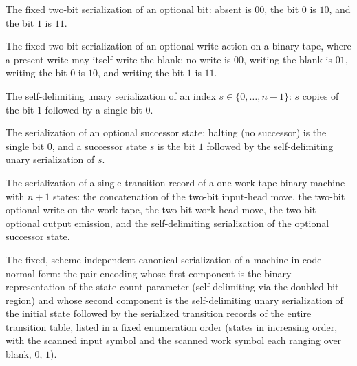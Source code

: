 \begin{definition}
\label{Turing.optBoolBits}
\leanok
The fixed two-bit serialization of an optional bit: absent is $00$, the bit
$0$ is $10$, and the bit $1$ is $11$.
\end{definition}

\begin{definition}
\label{Turing.optOptBoolBits}
\leanok
The fixed two-bit serialization of an optional write action on a binary
tape, where a present write may itself write the blank: no write is $00$,
writing the blank is $01$, writing the bit $0$ is $10$, and writing the bit
$1$ is $11$.
\end{definition}

\begin{definition}
\label{Turing.unaryFin}
\leanok
The self-delimiting unary serialization of an index $s \in \{0,\dots,n-1\}$:
$s$ copies of the bit $1$ followed by a single bit $0$.
\end{definition}

\begin{definition}
\label{Turing.optStateBits}
\leanok
{}
The serialization of an optional successor state: halting (no successor) is
the single bit $0$, and a successor state $s$ is the bit $1$ followed by the
self-delimiting unary serialization of $s$.
\end{definition}

\begin{definition}
\label{Turing.actionBits}
\leanok
{}
The serialization of a single transition record of a one-work-tape binary
machine with $n + 1$ states: the concatenation of the two-bit input-head
move, the two-bit optional write on the work tape, the two-bit work-head
move, the two-bit optional output emission, and the self-delimiting
serialization of the optional successor state.
\end{definition}

\begin{definition}
\label{Turing.CodeTM.serialize}
\leanok
{}
The fixed, scheme-independent canonical serialization of a machine in code
normal form: the pair encoding whose first component is the binary
representation of the state-count parameter (self-delimiting via the
doubled-bit region) and whose second component is the self-delimiting unary
serialization of the initial state followed by the serialized transition
records of the entire transition table, listed in a fixed enumeration order
(states in increasing order, with the scanned input symbol and the scanned
work symbol each ranging over blank, $0$, $1$).
\end{definition}

